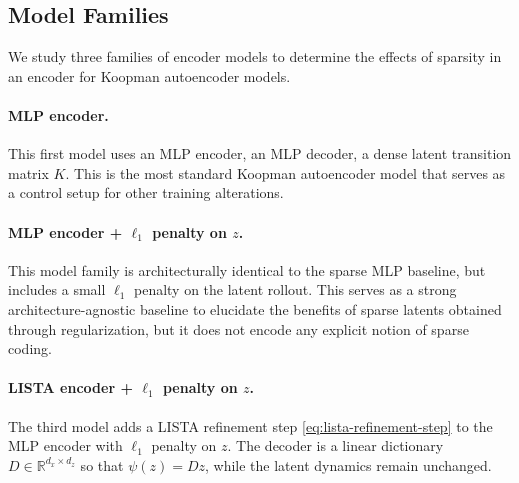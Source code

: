 \documentclass{article}
\begin{document}
\subsection{Model Families}

We study three families of encoder models to determine the effects of sparsity in an encoder for Koopman autoencoder models. 

\paragraph{MLP encoder.} This first model uses an MLP encoder, an MLP decoder, a dense latent transition matrix $K$. This is the most standard Koopman autoencoder model that serves as a control setup for other training alterations.

\paragraph{MLP encoder + $\ell_1$ penalty on $z$.}
This model family is architecturally identical to the sparse MLP baseline, but includes a small $\ell_1$ penalty on the latent rollout. This serves as a strong architecture-agnostic baseline to elucidate the benefits of sparse latents obtained through regularization, but it does not encode any explicit notion of sparse coding. 


\paragraph{LISTA encoder + $\ell_1$ penalty on $z$.}
The third model adds a LISTA refinement step \eqref{eq:lista-refinement-step} to the MLP encoder with $\ell_1$ penalty on $z$. The decoder is a linear dictionary $D \in \mathbb{R}^{d_x \times d_z}$ so that $\psi(z) = Dz$, while the latent dynamics remain unchanged.
\end{document}
